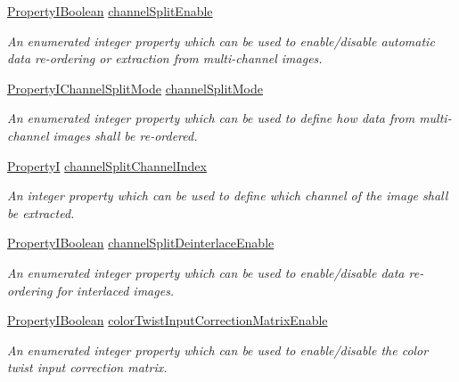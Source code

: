 \begin{DoxyCompactItemize}
\hyperlink{group___common_interface_ga44f9437e24b21b6c93da9039ec6786aa}{Property\+I\+Boolean} \hyperlink{classmv_i_m_p_a_c_t_1_1acquire_1_1_image_processing_a180de0eae56f31ec62fba059da8345ef}{channel\+Split\+Enable}
\begin{DoxyCompactList}\small\item\em An enumerated integer property which can be used to enable/disable automatic data re-\/ordering or extraction from multi-\/channel images. \end{DoxyCompactList}\item 
\hyperlink{group___common_interface_ga10dc070afa8c2d87bc6316c6a8507e82}{Property\+I\+Channel\+Split\+Mode} \hyperlink{classmv_i_m_p_a_c_t_1_1acquire_1_1_image_processing_a29e6579bdae98ea9fe26b5f982b8cf24}{channel\+Split\+Mode}
\begin{DoxyCompactList}\small\item\em An enumerated integer property which can be used to define how data from multi-\/channel images shall be re-\/ordered. \end{DoxyCompactList}\item 
\hyperlink{group___common_interface_ga12d5e434238ca242a1ba4c6c3ea45780}{Property\+I} \hyperlink{classmv_i_m_p_a_c_t_1_1acquire_1_1_image_processing_aefbc72fe4b938214fa4e8b1f7b709aca}{channel\+Split\+Channel\+Index}
\begin{DoxyCompactList}\small\item\em An integer property which can be used to define which channel of the image shall be extracted. \end{DoxyCompactList}\item 
\hyperlink{group___common_interface_ga44f9437e24b21b6c93da9039ec6786aa}{Property\+I\+Boolean} \hyperlink{classmv_i_m_p_a_c_t_1_1acquire_1_1_image_processing_addba5c4a6e43745b7e4445cb60c89287}{channel\+Split\+Deinterlace\+Enable}
\begin{DoxyCompactList}\small\item\em An enumerated integer property which can be used to enable/disable data re-\/ordering for interlaced images. \end{DoxyCompactList}\item 
\hyperlink{group___common_interface_ga44f9437e24b21b6c93da9039ec6786aa}{Property\+I\+Boolean} \hyperlink{classmv_i_m_p_a_c_t_1_1acquire_1_1_image_processing_a1059eb40d65d1ec9c66f5f0002b350c6}{color\+Twist\+Input\+Correction\+Matrix\+Enable}
\begin{DoxyCompactList}\small\item\em An enumerated integer property which can be used to enable/disable the color twist input correction matrix. \end{DoxyCompactList}\item 

\end{DoxyCompactItemize}

